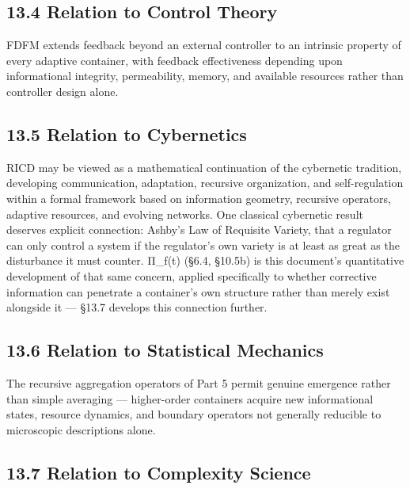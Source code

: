 \documentclass[
]{article}
\begin{document}
\hypertarget{relation-to-control-theory}{%
\subsection{13.4 Relation to Control
Theory}\label{relation-to-control-theory}}

FDFM extends feedback beyond an external controller to an intrinsic
property of every adaptive container, with feedback effectiveness
depending upon informational integrity, permeability, memory, and
available resources rather than controller design alone.

\hypertarget{relation-to-cybernetics}{%
\subsection{13.5 Relation to
Cybernetics}\label{relation-to-cybernetics}}

RICD may be viewed as a mathematical continuation of the cybernetic
tradition, developing communication, adaptation, recursive organization,
and self-regulation within a formal framework based on information
geometry, recursive operators, adaptive resources, and evolving
networks. One classical cybernetic result deserves explicit connection:
Ashby's Law of Requisite Variety, that a regulator can only control a
system if the regulator's own variety is at least as great as the
disturbance it must counter. Π\_f(t) (§6.4, §10.5b) is this document's
quantitative development of that same concern, applied specifically to
whether corrective information can penetrate a container's own structure
rather than merely exist alongside it --- §13.7 develops this connection
further.

\hypertarget{relation-to-statistical-mechanics}{%
\subsection{13.6 Relation to Statistical
Mechanics}\label{relation-to-statistical-mechanics}}

The recursive aggregation operators of Part 5 permit genuine emergence
rather than simple averaging --- higher-order containers acquire new
informational states, resource dynamics, and boundary operators not
generally reducible to microscopic descriptions alone.

\hypertarget{relation-to-complexity-science}{%
\subsection{13.7 Relation to Complexity
Science}\label{relation-to-complexity-science}}
\end{document}
